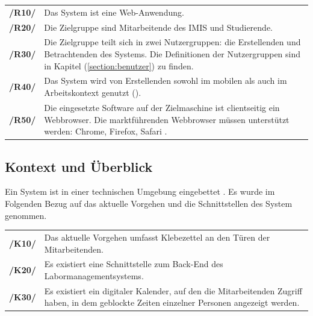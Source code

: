 \begin{center}
    \renewcommand{\arraystretch}{1.5}
    \begin{tabular}{p{}p{}}
    \hline
            \textbf{/R10/} & Das System ist eine Web-Anwendung.\\
            \textbf{/R20/} & Die Zielgruppe sind Mitarbeitende des IMIS und Studierende.\\
            \textbf{/R30/} & Die Zielgruppe teilt sich in zwei Nutzergruppen: die Erstellenden und
            Betrachtenden des Systems. Die Definitionen der Nutzergruppen sind in Kapitel (\ref{section:benutzer})
            zu finden.\\
            \textbf{/R40/} & Das System wird von Erstellenden sowohl im mobilen als auch im Arbeitskontext genutzt ().\\
            \textbf{/R50/} & Die eingesetzte Software auf der Zielmaschine ist clientseitig ein
            Webbrowser. Die marktführenden Webbrowser müssen unterstützt werden: Chrome, Firefox,
            Safari \cite{noauthor_browser_nodate}.\\
    \hline
    \end{tabular}
\end{center}

\subsection*{Kontext und Überblick}
\label{section:kontextueberblick}
Ein System ist in einer technischen Umgebung eingebettet \cite{balzert2009}. Es wurde im Folgenden Bezug auf das aktuelle Vorgehen und die Schnittstellen des System genommen.

\begin{center}
    \renewcommand{\arraystretch}{1.5}
    \begin{tabular}{p{}p{}}
    \hline
            \textbf{/K10/} & Das aktuelle Vorgehen umfasst Klebezettel an den Türen der Mitarbeitenden.\\
            \textbf{/K20/} & Es existiert eine Schnittstelle zum Back-End des Labormanagementsystems.\\
            \textbf{/K30/} & Es existiert ein digitaler Kalender, auf den die Mitarbeitenden Zugriff haben, in dem geblockte Zeiten einzelner Personen angezeigt werden.\\
    \hline
    \end{tabular}
\end{center}


